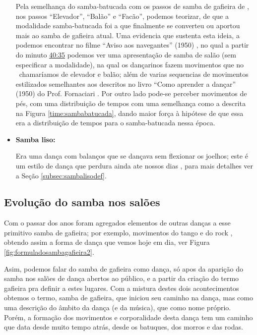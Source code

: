 \begin{itemize}
Pela semelhança do samba-batucada com os passos de samba de gafieira de \AnoLivro,
nos passos ``Elevador'', ``Balão'' e ``Facão'', podemos teorizar, de que a modalidade samba-batucada foi
a que finalmente se converteu ou aportou mais ao samba de gafieira atual.
Uma evidencia que sustenta esta ideia, a podemos encontrar no filme ``Aviso aos navegantes'' (1950) \cite[min. 40:35]{AtlantidaDance},
no qual a partir do minuto \href{http://www.bcc.org.br/filmes/443382}{40:35} podemos ver uma apresentação de samba de salão (sem especificar a modalidade),
na qual os dançarinos fazem movimentos que no \AnoLivro~chamaríamos de elevador e balão; 
além de varias sequencias de movimentos estilizados semelhantes aos descritos no livro ``Como aprender a dançar'' (1950) do Prof. Fornaciari \cite[pp. 163]{fornaciari1950aprender}.
Por outro lado pode-se perceber movimentos de pés, 
com uma distribuição de tempos com uma semelhança como a descrita na Figura \ref{time:sambabatucada},
dando maior força à hipótese de que essa era a distribuição de tempos para o samba-batucada nessa época. 

\item \textbf{Samba liso:}

Era uma dança com balanços que se dançava sem flexionar os joelhos;
este é um estilo de dança que perdura ainda ate nossos 
dias \cite[pp. 58,62]{freitas1959danca} \cite[pp. 61]{fornaciari1950aprender} \cite[pp. 143]{perna2002samba}, 
para mais detalhes ver a Seção \ref{subsec:sambalisodef}.
\end{itemize}

\subsection{Evolução do samba nos salões}

Com o passar dos anos foram agregados elementos de outras danças a esse primitivo samba de gafieira;
por exemplo, movimentos do tango e do rock \cite[pp. 142]{perna2002samba}, 
obtendo assim a forma de dança que vemos hoje em dia, ver Figura \ref{fig:formuladosambagafieira2}.

Asim, podemos falar do samba de gafieira como dança, só apos da aparição do samba nos
salões de dança abertos ao público, e a partir da criação do termo gafieira pra definir a estes lugares.
Com a mistura destes dois acontecimentos obtemos o termo, samba de gafieira,
que iniciou seu caminho na dança, mas como uma descrição do âmbito da dança (e da música), que como nome próprio.
Porém, a formação dos movimentos e corporalidade desta dança tem um caminho que data desde muito tempo atrás,
desde os batuques, dos morros e das rodas.


